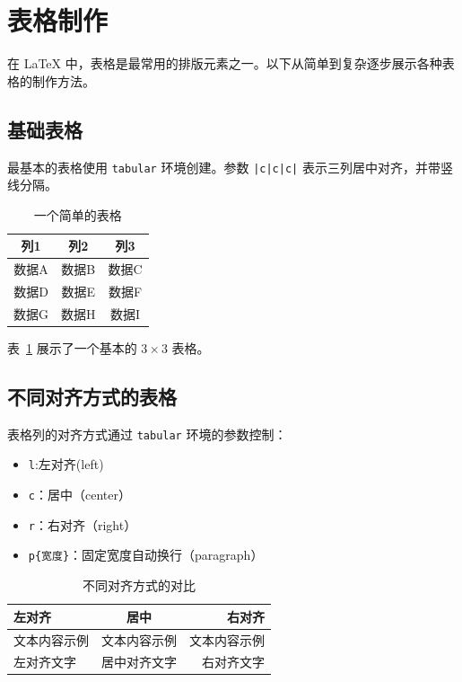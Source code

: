 \section{表格制作}%
\label{sec:tables}

在 LaTeX 中，表格是最常用的排版元素之一。以下从简单到复杂逐步展示各种表格的制作方法。

\subsection{基础表格}%
\label{subsec:basic-table}

最基本的表格使用 \texttt{tabular} 环境创建。参数 \texttt{|c|c|c|} 表示三列居中对齐，并带竖线分隔。

\begin{table}[ht]
\centering
\caption{一个简单的表格}%
\label{tab:simple}
\begin{tabular}{|c|c|c|}
\hline
\textbf{列1} & \textbf{列2} & \textbf{列3} \\
\hline
数据A & 数据B & 数据C \\
数据D & 数据E & 数据F \\
数据G & 数据H & 数据I \\
\hline
\end{tabular}
\end{table}

表~\ref{tab:simple} 展示了一个基本的 $3\times3$ 表格。

\subsection{不同对齐方式的表格}%
\label{subsec:alignment}

表格列的对齐方式通过 \texttt{tabular} 环境的参数控制：

\begin{itemize}
    \item \texttt{l}:左对齐(left)
    \item \texttt{c}：居中（center）
    \item \texttt{r}：右对齐（right）
    \item \texttt{p\{宽度\}}：固定宽度自动换行（paragraph）
\end{itemize}

\begin{table}[ht]
\centering
\caption{不同对齐方式的对比}%
\label{tab:alignment}
\begin{tabular}{|l|c|r|}
\hline
\textbf{左对齐} & \textbf{居中} & \textbf{右对齐} \\
\hline
文本内容示例 & 文本内容示例 & 文本内容示例 \\
左对齐文字 & 居中对齐文字 & 右对齐文字 \\
\hline
\end{tabular}
\end{table}

